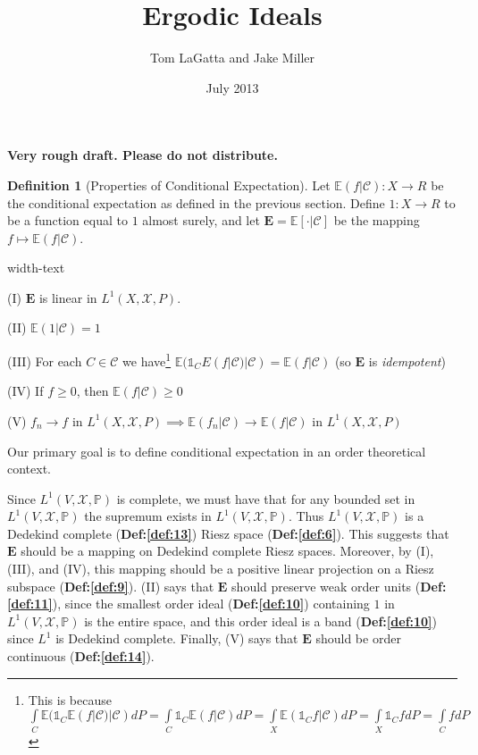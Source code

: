 \documentclass[letterpaper,10pt,oneside,onecolumn,reqno]{amsart}
\author{Tom LaGatta and Jake Miller}
\title{Ergodic Ideals}
\date{July 2013}
\newcommand{\C}{\mathcal C}
\newcommand{\E}{\mathbb E}
\renewcommand{\P}{\mathbb P}
\newcommand{\X}{\mathcal X}
\newcommand{\one}{\mathds{1}}      %
\theoremstyle{definition}
\newtheorem{defn}{Definition}
\begin{document}
\maketitle

\textbf{Very rough draft. Please do not distribute.}
\begin{defn}[Properties of Conditional Expectation]\label{def:1}
  Let $\E(f|\C) : X \to R$ be the conditional expectation as defined
  in the previous section. Define $1 : X \to R$ to be a function
  equal to $1$ almost surely, and let $\mathbf{E}=\E[\cdot|\C]$ be the
  mapping $f \mapsto \E(f|\C)$.
  \begin{deflist}{width-text}
  \item[(I)] $\mathbf{E}$ is linear in $L^1(X,\X,P)$.
  \item[(II)] $\E(1|\C) = 1$
  \item[(III)] For each $C \in \C$ we have\footnote{This is because
      $\int\limits_C\E(\one_C \E(f|\C)|\C)dP=\int\limits_C \one_C
      \E(f|\C)dP=\int\limits_X \E(\one_C f | \C)dP=\int\limits_X
      \one_C fdP=\int\limits_C fdP$ \label{fn:1}} $\E(\one_C
    E(f|\C)|\C) = \E(f|\C)$ (so $\mathbf{E}$ is \emph{idempotent})
  \item[(IV)] If $f \geq 0$, then $\E(f|\C) \geq 0$
  \item[(V)] $f_n \rightarrow f$ in $L^1(X,\X,P) \implies \E(f_n|\C)
    \rightarrow \E(f|\C)$ in $L^1(X,\X,P)$
  \end{deflist}
\end{defn}

Our primary goal is to define conditional expectation in an order
theoretical context.

\begin{framed}
  Since $L^1(V,\X,\P)$ is complete, we must have that for any bounded
  set in $L^1(V,\X,\P)$ the supremum exists in $L^1(V,\X,\P)$. Thus
  $L^1(V,\X,\P)$ is a Dedekind complete (\textbf{Def:\ref{def:13}})
  Riesz space (\textbf{Def:\ref{def:6}}). This suggests that
  $\mathbf{E}$ should be a mapping on Dedekind complete Riesz
  spaces. Moreover, by (I), (III), and (IV), this mapping should be a
  positive linear projection on a
  Riesz subspace (\textbf{Def:\ref{def:9}}). (II) says that
  $\mathbf{E}$ should preserve weak order units
  (\textbf{Def:\ref{def:11}}), since the smallest order ideal
  (\textbf{Def:\ref{def:10}}) containing $1$ in $L^1(V,\X,\P)$ is the
  entire space, and this order ideal is a band (\textbf{Def:\ref{def:10}})
  since $L^1$ is Dedekind complete. Finally, (V) says that
  $\mathbf{E}$ should be order continuous (\textbf{Def:\ref{def:14}}).
\end{framed}
\end{document}
